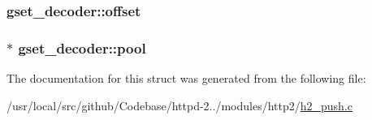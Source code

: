 \subsubsection[{\texorpdfstring{offset}{offset}}]{ gset\+\_\+decoder\+::offset}\hypertarget{structgset__decoder_a17fc838fc2564053065fd6f01fa82bcc}{}\label{structgset__decoder_a17fc838fc2564053065fd6f01fa82bcc}
\subsubsection[{\texorpdfstring{pool}{pool}}]{$\ast$ gset\+\_\+decoder\+::pool}\hypertarget{structgset__decoder_a8d62181fe6fe1545ad65a96ee67ea6de}{}\label{structgset__decoder_a8d62181fe6fe1545ad65a96ee67ea6de}


The documentation for this struct was generated from the following file\+:\begin{DoxyCompactItemize}
\item 
/usr/local/src/github/\+Codebase/httpd-\/2../modules/http2/\hyperlink{h2__push_8c}{h2\+\_\+push.\+c}\end{DoxyCompactItemize}
